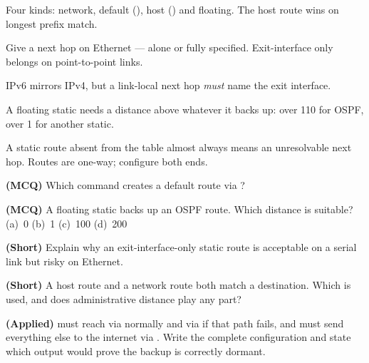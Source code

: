\begin{chaptersummary}
\begin{tight}
  \item Four kinds: network, default (), host () and
        floating. The host route wins on longest prefix match.
  \item Give a next hop on Ethernet --- alone or fully specified. Exit-interface
        only belongs on point-to-point links.
  \item IPv6 mirrors IPv4, but a link-local next hop \emph{must} name the exit
        interface.
  \item A floating static needs a distance above whatever it backs up: over 110
        for OSPF, over 1 for another static.
  \item A static route absent from the table almost always means an unresolvable
        next hop. Routes are one-way; configure both ends.
\end{tight}
\end{chaptersummary}

\begin{reviewq}
  \item \textbf{(MCQ)} Which command creates a default route via
        ?
        \begin{tight}
          \item[(a)] 
          \item[(b)] 
          \item[(c)] 
          \item[(d)] 
        \end{tight}
  \item \textbf{(MCQ)} A floating static backs up an OSPF route. Which distance
        is suitable? (a)~0 (b)~1 (c)~100 (d)~200
  \item \textbf{(Short)} Explain why an exit-interface-only static route is
        acceptable on a serial link but risky on Ethernet.
  \item \textbf{(Short)} A host route and a network route both match a
        destination. Which is used, and does administrative distance play any
        part?
  \item \textbf{(Applied)}  must reach  via
         normally and via  if that path fails, and must send
        everything else to the internet via . Write the complete
        configuration and state which  output would prove the backup is
        correctly dormant.
\end{reviewq}
